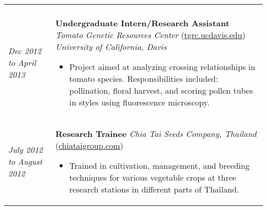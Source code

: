 ﻿\documentclass[a4paper]{article}
\begin{document}
\begin{tabular}{p{3cm} p{14cm}}
\begin{itemize}[noitemsep,topsep=0pt]
\end{itemize}
%
\\
%
\vspace{0pt} 
\textit{Dec 2012}\newline
\textit{to}\newline
\textit{April 2013}\newline
&
\vspace{0pt}
\textbf{Undergraduate Intern/Research Assistant}\newline
\textit{Tomato Genetic Resources Center} (\href{http://tgrc.ucdavis.edu/}{tgrc.ucdavis.edu})\newline
\textit{University of California, Davis}
\begin{itemize}[noitemsep,topsep=0pt]
  \item Project aimed at analyzing crossing relationships in tomato species. Responsibilities included: pollination, floral harvest, and scoring pollen tubes in styles using fluorescence microscopy.
\end{itemize}
%
\\
%
\vspace{0pt} 
\textit{July 2012}\newline
\textit{to}\newline
\textit{August 2012}\newline
&
\vspace{0pt}
\textbf{Research Trainee}\newline
\textit{Chia Tai Seeds Company, Thailand} (\href{http://www.chiataigroup.com/AboutUs.aspx}{chiataigroup.com})\newline
\begin{itemize}[noitemsep,topsep=0pt]
  \item Trained in cultivation, management, and breeding techniques for various vegetable crops at three research stations in different parts of Thailand.
\end{itemize}
\end{tabular}
\end{document}
